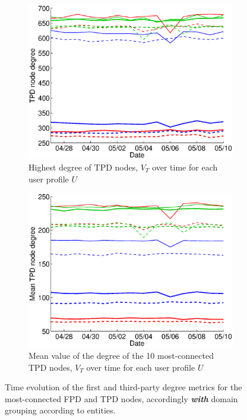 \documentclass{sig-alternate}
\begin{document}
\begin{figure}
\begin{subfigure}{.38\textwidth}
  \end{subfigure} 
  \begin{subfigure}{.38\textwidth}
    \includegraphics[width=\textwidth]{figures/plots/third-mean-top1-entities.eps}
    \caption{Highest degree of TPD nodes, $V_T$ over time for each user profile $U$}
    \label{fig:third_mean_top1_without_entities}
  \end{subfigure}
  \begin{subfigure}{.38\textwidth}
    \includegraphics[width=\textwidth]{figures/plots/third-mean-top10-entities.eps}
    \caption{Mean value of the degree of the 10 most-connected TPD nodes, $V_T$ over time for each user profile $U$}
    \label{fig:third_mean_top10_without_entities}
  \end{subfigure}
  
  \caption{Time evolution of the first and third-party degree metrics for the most-connected FPD and TPD nodes, accordingly \textbf{\textit{with}} domain grouping according to entities.}
  \label{fig:highest_degree_nodes_with_entities}
  \end{figure}
  
\end{document}
